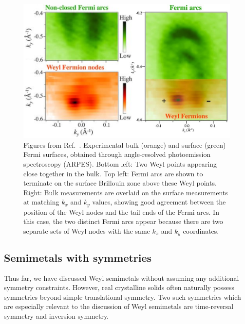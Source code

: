 \begin{figure}[htb!]
	\centering
	\includegraphics[width=.6\linewidth]{Images/TaAs_experiment}
	\caption{Figures from Ref.~\cite{Xu_WSM-experiment}. Experimental bulk (orange) and surface (green) Fermi surfaces, obtained through angle-resolved photoemission spectroscopy (ARPES). Bottom left: Two Weyl points appearing close together in the bulk. Top left: Fermi arcs are shown to terminate on the surface Brillouin zone above these Weyl points. Right: Bulk measurements are overlaid on the surface measurements at matching $k_x$ and $k_y$ values, showing good agreement between the position of the Weyl nodes and the tail ends of the Fermi arcs. In this case, the two distinct Fermi arcs appear because there are two separate sets of Weyl nodes with the same $k_x$ and $k_y$ coordinates.}
	\label{fig:TaAs_experiment}
\end{figure}


\subsection{Semimetals with symmetries}

Thus far, we have discussed Weyl semimetals without assuming any additional symmetry constraints. However, real crystalline solids often naturally possess symmetries beyond simple translational symmetry. Two such symmetries which are especially relevant to the discussion of Weyl semimetals are time-reversal symmetry and inversion symmetry.

